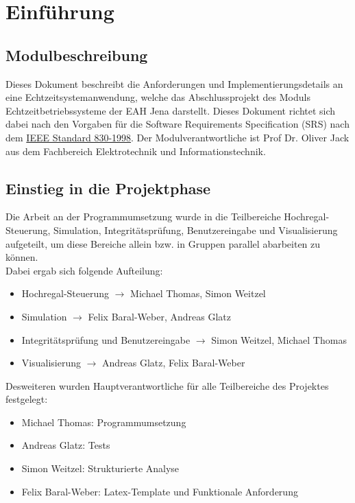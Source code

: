 \section{Einführung}
\subsection{Modulbeschreibung}
Dieses Dokument beschreibt die Anforderungen und Implementierungsdetails an eine Echtzeitsystemanwendung, welche das Abschlussprojekt des Moduls Echtzeitbetriebssysteme der EAH Jena darstellt. Dieses Dokument richtet sich dabei nach den Vorgaben für die Software Requirements Specification (SRS) nach dem \href{https://de.wikipedia.org/wiki/Software_Requirements_Specification}{IEEE Standard 830-1998}. Der Modulverantwortliche ist Prof Dr. Oliver Jack aus dem Fachbereich Elektrotechnik und Informationstechnik.\\

\subsection{Einstieg in die Projektphase}
Die Arbeit an der Programmumsetzung wurde in die Teilbereiche Hochregal-Steuerung, Simulation, Integritätsprüfung, Benutzereingabe und Visualisierung aufgeteilt, um diese Bereiche allein bzw. in Gruppen parallel  abarbeiten zu können.\\
Dabei ergab sich folgende Aufteilung:
\begin{itemize} 
	\item Hochregal-Steuerung $\rightarrow$ Michael Thomas, Simon Weitzel
	\item Simulation $\rightarrow$ Felix Baral-Weber, Andreas Glatz
	\item Integritätsprüfung und Benutzereingabe $\rightarrow$ Simon Weitzel, Michael Thomas
	\item Visualisierung $\rightarrow$ Andreas Glatz, Felix Baral-Weber
\end{itemize}

Desweiteren wurden Hauptverantwortliche für alle Teilbereiche des Projektes festgelegt:\\

\begin{itemize} 
	\item Michael Thomas: Programmumsetzung
	\item Andreas Glatz: Tests
	\item Simon Weitzel: Strukturierte Analyse
	\item Felix Baral-Weber: Latex-Template und Funktionale Anforderung
\end{itemize}